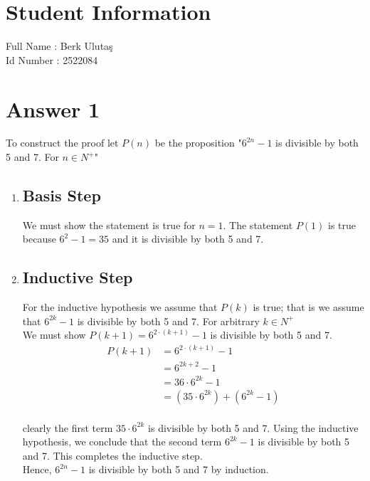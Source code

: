 \documentclass[12pt]{article}
\begin{document}
\section*{Student Information }
Full Name : Berk Ulutaş \\
Id Number :  2522084 \\

\section*{Answer 1}

To construct the proof let $P(n)$ be the proposition "$6^{2n}-1$ is divisible by both 5 and 7. For $n \in N^{+}$"
\noindent 

\begin{enumerate}[1)]

    \item 
        \subsection*{Basis Step}
           We must show the statement is true for $n=1$. The statement $P(1)$ is true because $6^{2} -1 = 35 $ and it is divisible by both 5 and 7. \\
           
    \item
        \subsection*{Inductive Step}
            For the inductive hypothesis we assume that $P(k)$ is true; that is we assume that $6^{2k}-1$ is divisible by both 5 and 7. For arbitrary $k \in N^{+}$ \\
            We must show $P(k+1) = 6^{2 \cdot (k+1)} -1$ is divisible by both 5 and 7.
            \begin{align*}
                P(k+1) &= 6^{2 \cdot (k+1)} -1 \\
                &= 6^{2k+2} -1 \\
                &= 36\cdot6^{2k} -1 \\
                &= (35\cdot6^{2k}) + (6^{2k} -1) \\
            \end{align*}


            clearly the first term $35 \cdot 6^{2k}$ is divisible by both 5 and 7. Using the inductive hypothesis, we conclude that the second term $6^{2k}-1$ is divisible by both 5 and 7. This completes the inductive step.\\

            Hence, $6^{2n}-1$ is divisible by both 5 and 7 by induction.
            
           
\end{enumerate}{}
\pagebreak
\end{document}
